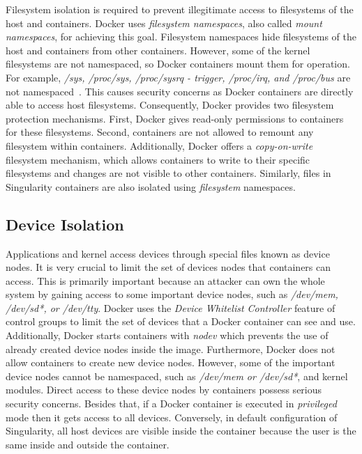 Filesystem isolation is required to prevent illegitimate access
to filesystems of the host and containers. Docker uses
\textit{filesystem namespaces}, also called \textit{mount namespaces},
for achieving this goal. Filesystem namespaces hide filesystems of
the host and containers from other containers. However, some of the
kernel filesystems are not namespaced, so Docker containers mount
them for operation. For example, \textit{/sys, /proc/sys,
/proc/sysrq - trigger, /proc/irq, and /proc/bus} are
not namespaced~\cite{walsh}.
This causes security concerns as Docker containers are directly
able to access host filesystems. Consequently, Docker provides
two filesystem protection mechanisms. First, Docker gives
read-only permissions to containers for these filesystems. Second,
containers are not allowed to remount any filesystem within containers.
Additionally, Docker offers a \textit{copy-on-write} filesystem mechanism,
which allows containers to write to their specific filesystems and changes
are not visible to other containers.
Similarly, files in Singularity containers are also isolated using
\textit{filesystem} namespaces.

\subsection{Device Isolation}

Applications and kernel access devices through special files
known as device nodes. It is very crucial to limit the set
of devices nodes that containers can access. This is primarily
important because an attacker can own the whole system by gaining access
to some important device nodes, such as \textit{/dev/mem, /dev/sd*,
or /dev/tty}. Docker uses the \textit{Device Whitelist Controller}
\cite{whitelistController} feature of control groups to limit the
set of devices that a Docker container can see and use.
Additionally, Docker starts containers with \textit{nodev} which
prevents the use of already created device nodes inside the image.
Furthermore, Docker does not allow containers to create new device
nodes. However, some of the important device nodes cannot be
namespaced, such as \textit{/dev/mem or /dev/sd*}, and kernel modules.
Direct access to these device nodes by containers possess serious
security concerns. Besides that, if a Docker container is executed
in \textit{privileged} mode then it gets access to all devices.
Conversely, in default configuration of Singularity, all host devices
are visible inside the container because the user is the same inside and
outside the container.


